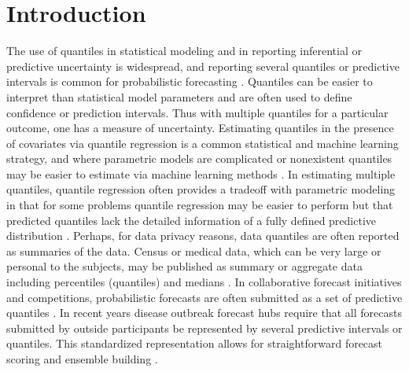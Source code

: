 \documentclass[preprint,12pt,authoryear]{elsarticle}
\newcommand{\1}[1]{\mathds{1}\left[#1\right]}
\begin{document}


\section{Introduction} \label{seq:intro}

The use of quantiles in statistical modeling and in reporting inferential or 
predictive uncertainty is widespread, and reporting several quantiles or 
predictive intervals is common for probabilistic forecasting 
\cite[]{gneiting2023model}. Quantiles can be easier to interpret than 
statistical model parameters and are often used to define confidence or 
prediction intervals. Thus with multiple quantiles for a particular outcome, 
one has a measure of uncertainty.
Estimating quantiles in the presence of covariates via 
quantile regression is a common
statistical and machine learning strategy, and where parametric models are 
complicated or nonexistent quantiles may be easier to estimate via machine 
learning methods \cite[]{martin2022direct,chung2021beyond, koenker2017quantile, 
koenker1978regression}. In estimating multiple quantiles, quantile regression 
often provides a tradeoff with parametric modeling in that for some problems 
quantile regression may be easier to perform but that predicted quantiles lack 
the detailed information of a fully defined predictive distribution 
\cite[]{pohle2020murphy}. 
Perhaps, for data privacy reasons, data quantiles are often reported as 
summaries of the data.
Census or medical data, which can be very large or personal to the subjects, 
may be published as summary or aggregate data including percentiles (quantiles) 
and medians 
\cite[]{simpson2023interpolating,cdc2022growthcharts,nirwan2020bayesian}. In 
collaborative forecast initiatives and competitions, probabilistic forecasts 
are often submitted as a set of predictive quantiles 
\cite[]{gneiting2023model,hong2016probabilistic}. In recent years disease 
outbreak forecast hubs require that all forecasts submitted by outside 
participants be represented by  several predictive intervals or quantiles. 
This standardized representation allows for straightforward forecast scoring 
and ensemble building 
\cite[]{mathis2024evaluation,mathis2023flusight,Cramer2022-hub-dataset,
cramer2022evaluation,sherratt2023predictive,bracher2021evaluating}.
 
\end{document}
